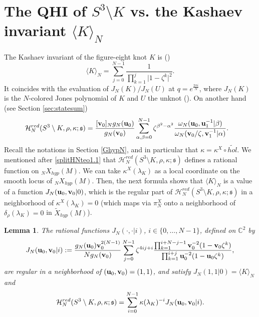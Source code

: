 \documentclass[11pt]{amsart}
\newtheorem{lem}[teo]{Lemma}
\newcommand{\mc}{\mathbb{C}}
\newcommand{\bu}{{\bf u}}
\newcommand{\bv}{{\bf v}}
\newcommand{\Hh}{{\mathcal H}}
\begin{document}
\section{The QHI of $S^3\setminus K$ vs. the Kashaev invariant $\langle K\rangle_N$}\label{sec:KvsQHI} The Kashaev invariant of the figure-eight knot $K$ is (\cite{Kvol})
$$\langle K \rangle_N = \sum_{j=0}^{N-1} \frac{1}{\prod_{k=1}^{j} \vert 1-\zeta^{k}\vert^2}.$$
It coincides with the evaluation of $J_N(K)/J_N(U)$ at $q=e^{\frac{2\pi i}{N}}$, where $J_N(K)$ is the $N$-colored Jones polynomial of $K$ and $U$ the unknot (\cite{MM}). On another hand (see Section \ref{sec:statesum})
\begin{align*}
\Hh_{N}^{red}(S^3\setminus K,\rho,\kappa; \mathfrak{s})
 & =\frac{[\bv_0]_Ng_N(\bu_0)}{g_N(\bv_0)}\sum_{\alpha,\beta=0}^{N-1} \zeta^{\beta^2-\alpha^2} \frac{\omega_N(\bu_0,\bu_1^{-1}\vert \beta)}{\omega_N(\bv_0/\zeta,\bv_1^{-1}\vert \alpha)}.  \end{align*}
Recall the notations in Section \ref{GhypN}, and in particular that $\kappa = \kappa^X\circ \widetilde{hol}$. We mentioned after \eqref{splitHNteo1.1} that $\Hh_{N}^{red}(S^3\setminus K,\rho,\kappa; \mathfrak{s})$ defines a rational function on ${}_NX_{hyp}(M)$. We can take $\kappa^X(\lambda_K)$ as a local coordinate on the smooth locus of ${}_NX_{hyp}(M)$. Then, the next formula shows that $\langle K \rangle_N$ is a value of a function $J_N(\bu_0,\bv_0 \vert 0)$, which is the regular part of $\Hh_{N}^{red}(S^3\setminus K,\rho,\kappa; \mathfrak{s})$ in a neighborhood of $\kappa^X(\lambda_K)=0$ (which maps via $\pi_N^X$ onto a neighborhood of $\delta_\rho(\lambda_K)=0$ in $\tilde X_{hyp}(M)$). 
 
\begin{lem} The rational functions $J_N(\cdot,\cdot \vert i)$, $i\in \{0,\ldots,N-1\}$, defined on $\mc^2$ by
$$J_N(\bu_0,\bv_0 \vert i) := \frac{g_N(\bu_0)\bv_0^{2(N-1)}}{Ng_N(\bv_0)} \sum_{j=0}^{N-1}
    \zeta^{4ij+i}\frac{\prod_{k=1}^{i+N-j-1}\bv_0^{-2}(1-\bv_0\zeta^{k})}{\prod_{k=1}^{i+j}\bu_0^{-2}(1-\bu_0\zeta^{k})},$$
are regular in a neighborhood of $(\bu_0,\bv_0)=(1,1)$, and satisfy $J_N(1,1 \vert 0) = \langle K \rangle_N$ and
\begin{equation}\label{ker8}
\Hh_{N}^{red}(S^3\setminus K,\rho,\kappa; \mathfrak{s}) = \sum_{i=0}^{N-1} \kappa(\lambda_K)^{-i} J_N(\bu_0,\bv_0 \vert i).
\end{equation}
\end{lem}
\end{document}
